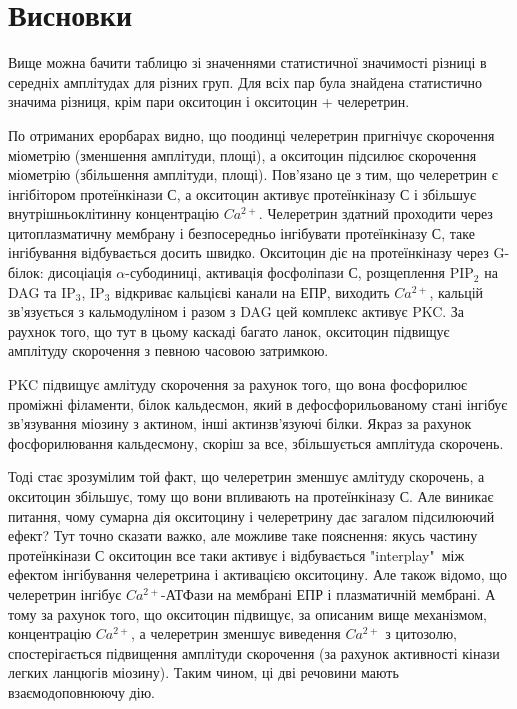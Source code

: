 \documentclass[12pt,a4paper,titlepage]{article}
\author{}
\date{}
\begin{document}
\section*{Висновки}
\begin{center}
\end{center}
Вище можна бачити таблицю зі значеннями статистичної значимості різниці в середніх амплітудах
для різних груп. Для всіх пар була знайдена статистично значима різниця, крім пари окситоцин і 
окситоцин + челеретрин.

По отриманих ерорбарах видно, що поодинці челеретрин пригнічує скорочення міометрію (зменшення
амплітуди, площі), а окситоцин підсилює скорочення міометрію (збільшення амплітуди, площі).
Пов'язано це з тим, що челеретрин є інгібітором протеїнкінази С, а окситоцин активує протеїнкіназу
С і збільшує внутрішньоклітинну концентрацію $Ca^{2+}$. Челеретрин здатний проходити через 
цитоплазматичну мембрану і безпосередньо інгібувати 
протеїнкіназу С, таке інгібування відбувається досить швидко. Окситоцин діє на протеїнкіназу
через G-білок: дисоціація $\alpha$-субодиниці, активація фосфоліпази С, розщеплення PIP$_2$ на
DAG та IP$_3$, IP$_3$ відкриває кальцієві канали на ЕПР, виходить $Ca^{2+}$, кальцій зв'язується
з кальмодуліном і разом з DAG цей комплекс активує PKC. За раухнок того, що тут в цьому каскаді 
багато ланок, окситоцин підвищує амплітуду скорочення з певною часовою затримкою.

PKC підвищує амлітуду скорочення за рахунок того, що вона фосфорилює проміжні філаменти, білок
кальдесмон, який в дефосфорильованому стані інгібує зв'язування міозину з актином, інші 
актинзв'язуючі білки. Якраз за рахунок фосфорилювання кальдесмону, скоріш за все, збільшується
амплітуда скорочень. 

Тоді стає зрозумілим той факт, що челеретрин зменшує амлітуду скорочень, а окситоцин збільшує, тому
що вони впливають на протеїнкіназу С. Але виникає питання, чому сумарна дія окситоцину і челеретрину
дає загалом підсилюючий ефект? Тут точно сказати важко, але можливе таке пояснення: якусь частину
протеїнкінази С окситоцин все таки активує і відбувається "interplay"\ між ефектом інгібування
челеретрина і активацією окситоцину. Але також відомо, що челеретрин інгібує $Ca^{2+}$-АТФази на
мембрані ЕПР і плазматичній мембрані. А тому за рахунок того, що окситоцин підвищує, за описаним
вище механізмом, концентрацію $Ca^{2+}$, а челеретрин зменшує виведення $Ca^{2+}$ з цитозолю, 
спостерігається підвищення амплітуди скорочення (за рахунок активності кінази легких ланцюгів міозину). Таким чином, ці дві речовини мають взаємодоповнюючу дію.
\end{document}
